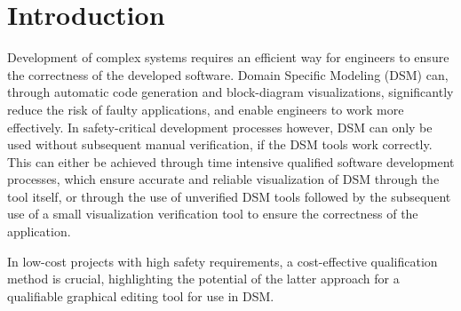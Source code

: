 \chapter{Introduction}
\label{chp:introduction}

Development of complex systems requires an efficient way for engineers to ensure the correctness of the developed software. Domain Specific Modeling (DSM) can, through automatic code generation and block-diagram visualizations, significantly reduce the risk of faulty applications, and enable engineers to work more effectively. In safety-critical development processes however, DSM can only be used without subsequent manual verification, if the DSM tools work correctly. This can either be achieved through time intensive qualified software development processes, which ensure accurate and reliable visualization of DSM through the tool itself, or through the use of unverified DSM tools followed by the subsequent use of a small visualization verification tool to ensure the correctness of the application.

In low-cost projects with high safety requirements, a cost-effective qualification method is crucial, highlighting the potential of the latter approach for a qualifiable graphical editing tool for use in DSM.


